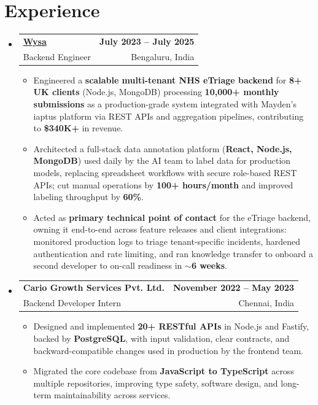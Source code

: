 \documentclass[letterpaper,10pt]{article}
\makeatletter
\newcommand{\resumeItem}[1]{
  \item\small{#1\vspace{-1pt}}
}
\newcommand{\resumeSubheading}[4]{
  \vspace{1pt}\item
    \begin{tabular*}{0.985\textwidth}[t]{l@{\extracolsep{\fill}}r}
      \textbf{#1} & \textbf{\small #2} \\
      {\small\color{ResumeSlate} #3} & {\small\color{ResumeSlate} #4} \\
    \end{tabular*}\vspace{-6pt}
}
\newcommand{\resumeSubHeadingListStart}{\begin{itemize}[leftmargin=0.0in, label={}, itemsep=2pt, topsep=2pt]}
\newcommand{\resumeSubHeadingListEnd}{\end{itemize}}
\newcommand{\resumeItemListStart}{\begin{itemize}[leftmargin=0.18in, itemsep=2pt, topsep=1pt]}
\newcommand{\resumeItemListEnd}{\end{itemize}\vspace{-4pt}}
\makeatother
\begin{document}
\section{Experience}
\resumeSubHeadingListStart
  \resumeSubheading
    {\href{https://www.wysa.io}{Wysa}}{July 2023 -- July 2025}
    {Backend Engineer}{Bengaluru, India}
    \resumeItemListStart
      \resumeItem{Engineered a \textbf{scalable multi-tenant NHS eTriage backend} for \textbf{8+ UK clients} (Node.js, MongoDB) processing \textbf{10{,}000+ monthly submissions} as a production-grade system integrated with Mayden's iaptus platform via REST APIs and aggregation pipelines, contributing to \textbf{\$340K+} in revenue.}
      \resumeItem{Architected a full-stack data annotation platform (\textbf{React, Node.js, MongoDB}) used daily by the AI team to label data for production models, replacing spreadsheet workflows with secure role-based REST APIs; cut manual operations by \textbf{100+ hours/month} and improved labeling throughput by \textbf{60\%}.}
      \resumeItem{Acted as \textbf{primary technical point of contact} for the eTriage backend, owning it end-to-end across feature releases and client integrations: monitored production logs to triage tenant-specific incidents, hardened authentication and rate limiting, and ran knowledge transfer to onboard a second developer to on-call readiness in \textbf{$\sim$6 weeks}.}
    \resumeItemListEnd
  \resumeSubheading
    {Cario Growth Services Pvt. Ltd.}{November 2022 -- May 2023}
    {Backend Developer Intern}{Chennai, India}
    \resumeItemListStart
      \resumeItem{Designed and implemented \textbf{20+ RESTful APIs} in Node.js and Fastify, backed by \textbf{PostgreSQL}, with input validation, clear contracts, and backward-compatible changes used in production by the frontend team.}
      \resumeItem{Migrated the core codebase from \textbf{JavaScript to TypeScript} across multiple repositories, improving type safety, software design, and long-term maintainability across services.}
    \resumeItemListEnd
\resumeSubHeadingListEnd
\vspace{-4pt}
\end{document}

